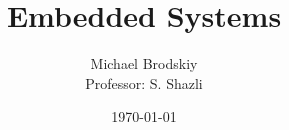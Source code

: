 


\title{Embedded Systems}
\date{\today}
\author{Michael Brodskiy\\ \small Professor: S. Shazli}



\maketitle

\newpage

\tableofcontents

\newpage

